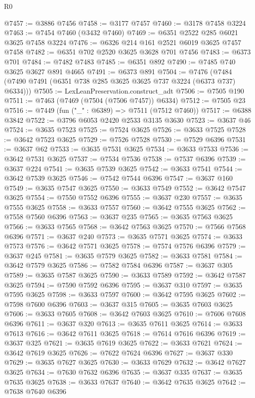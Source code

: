 \begin{lexlean}{R0}
\begin{coremodule}
@7457 := @3886 @7456
@7458 := @3177 @7457
@7460 := @3178 @7458 @3224
@7463 := @7454 @7460 (@3432 @7460)
@7469 := @6351 @2522 @285 @6021 @3625 @7458 @3224
@7476 := @6326 @214 @161 @2521 @6019 @3625 @7457 @7458
@7482 := @6351 @702 @2520 @3625 @3628 @701 @7456
@7483 := @6373 @701
@7484 := @7482 @7483
@7485 := @6351 @892
@7490 := @7485 @740 @3625 @3627 @891 @4665
@7491 := @6373 @891
@7504 := @7476 (@7484 (@7490 @7491 (@6351 @738 @285 @3625 @3625 @737 @3224 (@6373 @737) @6334)))
@7505 := LexLeanPreservation.construct_adt
@7506 := @7505 @190
@7511 := @7463 (@7469 (@7504 (@7506 @7457)) @6334)
@7512 := @7505 @23
@7516 := @7449 (fun ("_" : @6389) => @7511 (@7512 @7460))
@7517 := @6388 @3842
@7522 := @3796 @6053 @2420 @2533 @3135 @3630
@7523 := @3637 @46
@7524 := @3635 @7523
@7525 := @7524 @3625
@7526 := @3633 @7525
@7528 := @3642 @7523 @3625
@7529 := @7526 @7528
@7530 := @7529 @6396
@7531 := @3637 @62
@7533 := @3635 @7531 @3625
@7534 := @3633 @7533
@7536 := @3642 @7531 @3625
@7537 := @7534 @7536
@7538 := @7537 @6396
@7539 := @3637 @224
@7541 := @3635 @7539 @3625
@7542 := @3633 @7541
@7544 := @3642 @7539 @3625
@7546 := @7542 @7544 @6396
@7547 := @3637 @160
@7549 := @3635 @7547 @3625
@7550 := @3633 @7549
@7552 := @3642 @7547 @3625
@7554 := @7550 @7552 @6396
@7555 := @3637 @230
@7557 := @3635 @7555 @3625
@7558 := @3633 @7557
@7560 := @3642 @7555 @3625
@7562 := @7558 @7560 @6396
@7563 := @3637 @235
@7565 := @3635 @7563 @3625
@7566 := @3633 @7565
@7568 := @3642 @7563 @3625
@7570 := @7566 @7568 @6396
@7571 := @3637 @240
@7573 := @3635 @7571 @3625
@7574 := @3633 @7573
@7576 := @3642 @7571 @3625
@7578 := @7574 @7576 @6396
@7579 := @3637 @245
@7581 := @3635 @7579 @3625
@7582 := @3633 @7581
@7584 := @3642 @7579 @3625
@7586 := @7582 @7584 @6396
@7587 := @3637 @305
@7589 := @3635 @7587 @3625
@7590 := @3633 @7589
@7592 := @3642 @7587 @3625
@7594 := @7590 @7592 @6396
@7595 := @3637 @310
@7597 := @3635 @7595 @3625
@7598 := @3633 @7597
@7600 := @3642 @7595 @3625
@7602 := @7598 @7600 @6396
@7603 := @3637 @315
@7605 := @3635 @7603 @3625
@7606 := @3633 @7605
@7608 := @3642 @7603 @3625
@7610 := @7606 @7608 @6396
@7611 := @3637 @320
@7613 := @3635 @7611 @3625
@7614 := @3633 @7613
@7616 := @3642 @7611 @3625
@7618 := @7614 @7616 @6396
@7619 := @3637 @325
@7621 := @3635 @7619 @3625
@7622 := @3633 @7621
@7624 := @3642 @7619 @3625
@7626 := @7622 @7624 @6396
@7627 := @3637 @330
@7629 := @3635 @7627 @3625
@7630 := @3633 @7629
@7632 := @3642 @7627 @3625
@7634 := @7630 @7632 @6396
@7635 := @3637 @335
@7637 := @3635 @7635 @3625
@7638 := @3633 @7637
@7640 := @3642 @7635 @3625
@7642 := @7638 @7640 @6396

\end{coremodule}
\end{lexlean}
